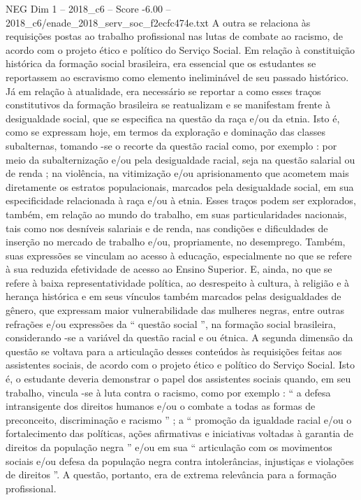 \begin{textsample}{NEG Dim 1 – 2018\_c6 – Score -6.00 – 2018\_c6/enade\_2018\_serv\_soc\_f2ecfc474e.txt}
A outra se relaciona às requisições postas ao trabalho profissional nas lutas de combate ao racismo, de acordo com o projeto ético e político do Serviço Social.
Em relação à constituição histórica da formação social brasileira, era essencial que os estudantes se reportassem ao escravismo como elemento ineliminável de seu passado histórico.
Já em relação à atualidade, era necessário se reportar a como esses traços constitutivos da formação brasileira se reatualizam e se manifestam frente à desigualdade social, que se especifica na questão da raça e/ou da etnia.
Isto é, como se expressam hoje, em termos da exploração e dominação das classes subalternas, tomando -se o recorte da questão racial como, por exemplo : por meio da subalternização e/ou pela desigualdade racial, seja na questão salarial ou de renda ; na violência, na vitimização e/ou aprisionamento que acometem mais diretamente os estratos populacionais, marcados pela desigualdade social, em sua especificidade relacionada à raça e/ou à etnia.
Esses traços podem ser explorados, também, em relação ao mundo do trabalho, em suas particularidades nacionais, tais como nos desníveis salariais e de renda, nas condições e dificuldades de inserção no mercado de trabalho e/ou, propriamente, no desemprego.
Também, suas expressões se vinculam ao acesso à educação, especialmente no que se refere à sua reduzida efetividade de acesso ao Ensino Superior.
E, ainda, no que se refere à baixa representatividade política, ao desrespeito à cultura, à religião e à herança histórica e em seus vínculos também marcados pelas desigualdades de gênero, que expressam maior vulnerabilidade das mulheres negras, entre outras refrações e/ou expressões da “ questão social ”, na formação social brasileira, considerando -se a variável da questão racial e ou étnica.
A segunda dimensão da questão se voltava para a articulação desses conteúdos às requisições feitas aos assistentes sociais, de acordo com o projeto ético e político do Serviço Social.
Isto é, o estudante deveria demonstrar o papel dos assistentes sociais quando, em seu trabalho, vincula -se à luta contra o racismo, como por exemplo : “ a defesa intransigente dos direitos humanos e/ou o combate a todas as formas de preconceito, discriminação e racismo ” ; a “ promoção da igualdade racial e/ou o fortalecimento das políticas, ações afirmativas e iniciativas voltadas à garantia de direitos da população negra ” e/ou em sua “ articulação com os movimentos sociais e/ou defesa da população negra contra intolerâncias, injustiças e violações de direitos ”.
A questão, portanto, era de extrema relevância para a formação profissional.

\end{textsample}
